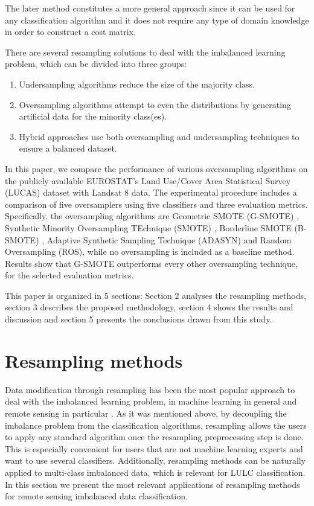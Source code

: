 \documentclass[remotesensing,article,submit,moreauthors,pdftex]{Definitions/mdpi}
\begin{document}
The later method constitutes a more general approach since it can be used for
any classification algorithm and it does not require any type of domain
knowledge in order to construct a cost matrix.

There are several resampling solutions to deal with the imbalanced learning
problem, which can be divided into three groups:

\begin{enumerate}

	\item Undersampling algorithms reduce the size of the majority class.

	\item Oversampling algorithms attempt to even the distributions by
	generating artificial data for the minority class(es).

	\item Hybrid approaches use both oversampling and undersampling techniques
	to ensure a balanced dataset.

\end{enumerate}

In this paper, we compare the performance of various oversampling algorithms on
the publicly available EUROSTAT's Land Use/Cover Area Statistical Survey
(LUCAS) dataset \cite{LUCAS2015C3} with Landsat 8 data. The experimental 
procedure includes a comparison of five oversamplers using five classifiers and 
three evaluation metrics. Specifically, the oversampling algorithms are 
Geometric SMOTE (G-SMOTE) \cite{Douzas2019}, Synthetic Minority Oversampling 
TEchnique (SMOTE) \cite{Chawla2002}, Borderline SMOTE (B-SMOTE) \cite{Han2005}, 
Adaptive Synthetic Sampling Technique (ADASYN) \cite{HaiboHe2008} and Random 
Oversampling (ROS), while no oversampling is included as a baseline method. 
Results show that G-SMOTE outperforms every other oversampling technique, for 
the selected evaluation metrics.

This paper is organized in 5 sections: Section 2 analyses the resampling methods,
section 3 describes the proposed methodology, section 4 shows the results and
discussion and section 5 presents the conclusions drawn from this study.

\section{Resampling methods}

Data modification through resampling has been the most popular approach to deal
with the imbalanced learning problem, in machine learning in general and remote
sensing in particular \cite{Feng2019}. As it was mentioned above, by decoupling
the imbalance problem from the classification algorithms, resampling allows the
users to apply any standard algorithm once the resampling preprocessing step is
done. This is especially convenient for users that are not machine learning
experts and want to use several classifiers. Additionally, resampling methods
can be naturally applied to multi-class imbalanced data, which is relevant for
LULC classification. In this section we present the most relevant applications
of resampling methods for remote sensing imbalanced data classification.
\end{document}
